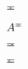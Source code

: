 \documentclass{article}
\makeatletter
\newcommand{\superimpose}[2]{%
  {\ooalign{$#1\@firstoftwo#2$\cr\hfil$#1\@secondoftwo#2$\hfil\cr}}}
\makeatother
\begin{document}
$\mathpalette\superimpose{{=}{\cdot}}$

$A^{\mathpalette\superimpose{{=}{\cdot}}}$

$\mathpalette\superimpose{{=}{\mskip5mu\cdot}}$

$\mathpalette\superimpose{{=}{\mskip-5mu\cdot}}$
\end{document}
